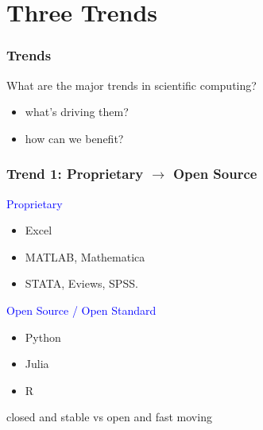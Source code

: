 \documentclass[
    xcolor={svgnames,dvipsnames},
    hyperref={colorlinks, citecolor=DeepPink4, linkcolor=DarkRed, urlcolor=DarkBlue}
    ]{beamer}  %
\newcommand{\blue}[1]{\textcolor{Blue}{\sf #1}}
\newcommand{\1}{\mathbbm 1}
\begin{document}
\section{Three Trends}

\begin{frame}
    \frametitle{Trends}

    What are the major trends in scientific computing?

    \vspace{0.5em}
    \vspace{0.5em}

    \begin{itemize}
        \item what's driving them?
        \vspace{0.5em}
        \item how can we benefit?
    \end{itemize}
\end{frame}



\begin{frame}
    \frametitle{Trend 1: Proprietary $\to$ Open Source}
    
    \blue{Proprietary} 
    \begin{itemize}
        \item Excel
        \item MATLAB, Mathematica
        \item STATA, Eviews, SPSS.
    \end{itemize}
    

    \vspace{0.5em}
    \vspace{0.5em}
    \blue{Open Source / Open Standard} 
    
    \begin{itemize}
        \item Python
        \item Julia
        \item R
    \end{itemize}


    \begin{center}
        closed and stable vs open and fast moving
    \end{center}

\end{frame}
\end{document}
